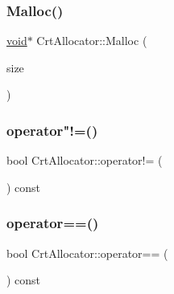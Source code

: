 \mbox{\label{classCrtAllocator_acd720631f8c094041afa6c7951f0d935}} 
\subsubsection{\texorpdfstring{Malloc()}{Malloc()}}
{\footnotesize\ttfamily \hyperlink{imgui__impl__opengl3__loader_8h_ac668e7cffd9e2e9cfee428b9b2f34fa7}{void}$\ast$ Crt\+Allocator\+::\+Malloc (\begin{DoxyParamCaption}\item[{size\+\_\+t}]{size }\end{DoxyParamCaption})\hspace{0.3cm}{\ttfamily [inline]}}

\mbox{\label{classCrtAllocator_a1fb8ca99a43c939595e5c0b548d7532c}} 
\subsubsection{\texorpdfstring{operator"!=()}{operator!=()}}
{\footnotesize\ttfamily bool Crt\+Allocator\+::operator!= (\begin{DoxyParamCaption}\item[{const \hyperlink{classCrtAllocator}{Crt\+Allocator} \&}]{ }\end{DoxyParamCaption}) const\hspace{0.3cm}{\ttfamily [inline]}}

\mbox{\label{classCrtAllocator_ae65fb1b4e1272d05e003be57feac68a6}} 
\subsubsection{\texorpdfstring{operator==()}{operator==()}}
{\footnotesize\ttfamily bool Crt\+Allocator\+::operator== (\begin{DoxyParamCaption}\item[{const \hyperlink{classCrtAllocator}{Crt\+Allocator} \&}]{ }\end{DoxyParamCaption}) const\hspace{0.3cm}{\ttfamily [inline]}}

